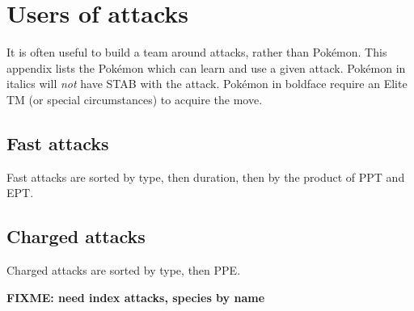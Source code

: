\documentclass[ebook,10pt,openany,oneside]{memoir}
\begin{document}
\chapter{Users of attacks}
\label{chap:attackemployers}
It is often useful to build a team around attacks, rather than Pokémon.
This appendix lists the Pokémon which can learn and use a given attack.
Pokémon in italics will \textit{not} have STAB with the attack.
Pokémon in boldface require an Elite TM (or special circumstances) to acquire the move.

\section{Fast attacks}
\label{sec:usersfast}
Fast attacks are sorted by type, then duration, then by the product of PPT and EPT\@.


\section{Charged attacks}
\label{sec:userscharged}
Charged attacks are sorted by type, then PPE\@.


\textbf{FIXME: need index attacks, species by name}

\backmatter

\end{document}
